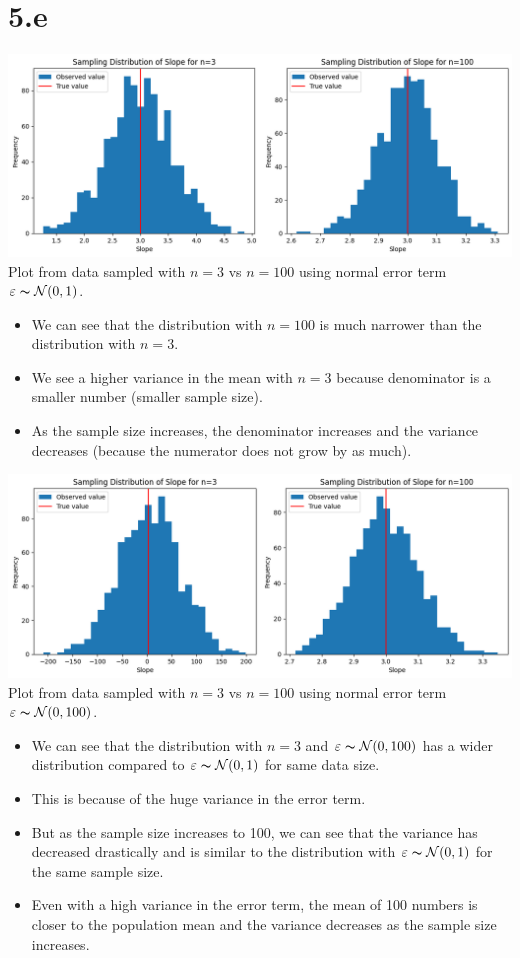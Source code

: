 \documentclass[12pt]{article}
\begin{document}
\section*{5.e}
\includegraphics*[width=\linewidth]{graph5b}
Plot from data sampled with \(n = 3\) vs \(n = 100\) using normal error term
\(\varepsilon \thicksim \mathcal{N}(0, 1)\).
\begin{itemize}
    \item We can see that the distribution with \(n = 100\) is much narrower
    than the distribution with \(n = 3\).
    \item We see a higher variance in the mean with \(n = 3\) because
    denominator is a smaller number (smaller sample size).
    \item As the sample size increases, the denominator increases and the
    variance decreases (because the numerator does not grow by as much).
\end{itemize}
\includegraphics*[width=\linewidth]{graph5c}
Plot from data sampled with \(n = 3\) vs \(n = 100\) using normal error term
\(\varepsilon \thicksim \mathcal{N}(0, 100)\).
\begin{itemize}
    \item We can see that the distribution with \(n=3\) and
    \(\varepsilon \thicksim \mathcal{N}(0, 100)\) has a wider distribution
    compared to \(\varepsilon \thicksim \mathcal{N}(0, 1)\) for same data size.
    \item This is because of the huge variance in the error term.
    \item But as the sample size increases to 100, we can see that the variance
    has decreased drastically and is similar to the distribution with
    \(\varepsilon \thicksim \mathcal{N}(0, 1)\) for the same sample size.
    \item Even with a high variance in the error term, the mean of 100 numbers
    is closer to the population mean and the variance decreases as the sample
    size increases.
\end{itemize}
\end{document}
